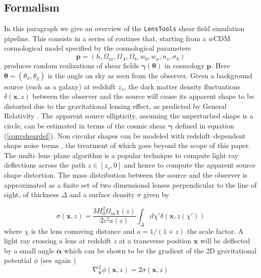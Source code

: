 \documentclass[5p]{elsarticle}
\newcommand{\bb}[1]{\mathbf{#1}}
\newcommand{\LT}{\texttt{LensTools} }
\begin{document}
\subsection{Formalism}
%
In this paragraph we give an overview of the \LT shear field simulation pipeline. This consists in a series of routines that, starting from a $w$CDM cosmological model specified by the cosmological parameters 
\begin{equation}
\bb{p}=(h,\Omega_m,\Omega_\Lambda,\Omega_b,w_0,w_a,n_s,\sigma_8)
\end{equation} 
%
produces random realizations of shear fields $\pmb{\gamma}(\pmb{\theta})$ in cosmology $\bb{p}$. Here $\pmb{\theta}=(\theta_x,\theta_y)$ is the angle on sky as seen from the observer. Given a background source (such as a galaxy) at redshift $z_s$, the dark matter density fluctuations $\delta(\bb{x},z)$ between the observer and the source will cause its apparent shape to be distorted due to the gravitational lensing effect, as predicted by General Relativity \citep{wlreview}. The apparent source ellipticity, assuming the unperturbed shape is a circle, can be estimated in terms of the cosmic shear $\pmb{\gamma}$ defined in equation (\ref{convsheardef}). Non circular shapes can be modeled with redshift--dependent shape noise terms \citep{wlreview}, the treatment of which goes beyond the scope of this paper. The multi--lens--plane algorithm \citep{RayTracingHartlap,Ray1,Ray2,Ray3} is a popular technique to compute light ray deflections across the path $z\in[z_s,0]$ and hence to compute the apparent source shape distortion. The mass distribution between the source and the observer is approximated as a finite set of two dimensional lenses perpendicular to the line of sight, of thickness $\Delta$ and a surface density $\sigma$ given by 

\begin{equation}
\label{surfacedensity}
\sigma(\bb{x},z) = \frac{3H_0^2\Omega_m\chi(z)}{2c^2a(z)}\int_\Delta d\chi'\delta\left(\bb{x},z(\chi')\right)
\end{equation}
%
where $\chi$ is the lens comoving distance and $a=1/(1+z)$ the scale factor. A light ray crossing a lens at redshift $z$ at a transverse position $\bb{x}$ will be deflected by a small angle $\pmb{\alpha}$ which can be shown to be the gradient of the 2D gravitational potential $\phi$ (see again \citep{RayTracingHartlap}) 
%
\begin{equation}
\label{poisson}
\nabla^2_\bb{x} \phi(\bb{x},z) = 2\sigma(\bb{x},z)
\end{equation}
\end{document}

